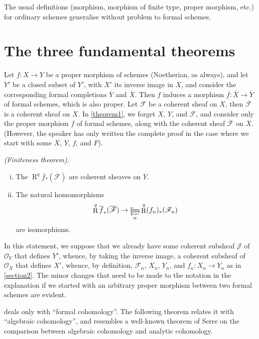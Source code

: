 \documentclass{article}
\theoremstyle{plain}
\newenvironment{theorem}[1]
  {\renewcommand\theinnercustomtheorem{#1}\innercustomtheorem}
  {\endinnercustomtheorem}
\theoremstyle{definition}
\newcommand{\sh}[1]{{\mathscr{#1}}}
\DeclareMathOperator{\RR}{R}
\newcommand{\oldpage}[1]{\marginpar{\footnotesize$\Big\vert$ \textit{p.~#1}}}
\begin{document}
The usual definitions (morphism, morphism of finite type, proper morphism, etc.) for ordinary schemes generalise without problem to formal schemes.


\section{The three fundamental theorems}
\label{section3}

Let $f\colon X\to Y$ be a proper morphism of schemes (Noetherian, as always), and let $Y'$ be a closed subset of $Y'$, with $X'$ its inverse image in $X$, and consider the corresponding formal completions $\overline{Y}$ and $\overline{X}$.
Then $f$ induces a morphism $\overline{f}\colon\overline{X}\to\overline{Y}$ of formal schemes, which is also proper.
Let $\sh{F}$ be a coherent sheaf on $X$, then $\overline{\sh{F}}$ is a coherent sheaf on $\overline{X}$.
In \cref{theorem1}, we forget $X$, $Y$, and $\sh{F}$, and consider only the proper morphism $\overline{f}$ of formal schemes, along with the coherent sheaf $\overline{\sh{F}}$ on $\overline{X}$.
(However, the speaker has only written the complete proof in the case where we start with some $X$, $Y$, $f$, and $F$).

\begin{theorem}{1}
\label{theorem1}
  \emph{(Finiteness theorem).}
  \begin{enumerate}[i.]
    \item The $\RR^q\overline{f}_*(\overline{\sh{F}})$ are coherent sheaves on $\overline{Y}$.
    \item The natural homomorphisms
      \[
        \RR^q\overline{f}_*(\overline{\sh{F}}) \to \varprojlim_n\RR^q (f_n)_*(\sh{F}_n)
      \]
      are isomorphisms.
  \end{enumerate}
\end{theorem}

In this statement, we suppose that we already have some coherent subsheaf $\sh{J}$ of $\sh{O}_Y$ that defines $Y'$, whence, by taking the inverse image, a coherent subsheaf of $\sh{O}_X$ that defines $X'$, whence, by definition, $\sh{F}_n$, $X_n$, $Y_n$, and $f_n\colon X_n\to Y_n$ as in \cref{section2}.
The minor changes that need to be made to the notation in the explanation if we started with an arbitrary proper morphism between two formal schemes are evident.

 deals only with ``formal cohomology''.
The following theorem
\oldpage{182-05}
relates it with ``algebraic cohomology'', and resembles a well-known theorem of Serre \cite{4} on the comparison between algebraic cohomology and analytic cohomology.
\end{document}
